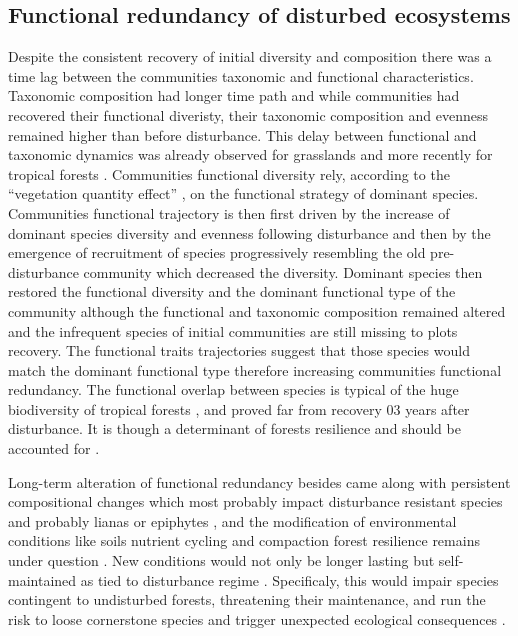 \documentclass[fleqn,10pt]{ArtEcoFoG} %
\theoremstyle{definition}
\theoremstyle{definition}
\theoremstyle{definition}
\theoremstyle{remark}
\begin{document}
\subsection{Functional redundancy of disturbed
ecosystems}\label{functional-redundancy-of-disturbed-ecosystems}

Despite the consistent recovery of initial diversity and composition
there was a time lag between the communities taxonomic and functional
characteristics. Taxonomic composition had longer time path and while
communities had recovered their functional diveristy, their taxonomic
composition and evenness remained higher than before disturbance. This
delay between functional and taxonomic dynamics was already observed for
grasslands \citep{Tilman1997, Mouillot2011} and more recently for
tropical forests \citep{Lohbeck2015, Guariguata2001}. Communities
functional diversity rely, according to the ``vegetation quantity
effect'' \citep{Grime1998}, on the functional strategy of dominant
species. Communities functional trajectory is then first driven by the
increase of dominant species diversity and evenness following
disturbance and then by the emergence of recruitment of species
progressively resembling the old pre-disturbance community which
decreased the diversity. Dominant species then restored the functional
diversity and the dominant functional type of the community although the
functional and taxonomic composition remained altered and the infrequent
species of initial communities are still missing to plots recovery. The
functional traits trajectories suggest that those species would match
the dominant functional type therefore increasing communities functional
redundancy. The functional overlap between species is typical of the
huge biodiversity of tropical forests \citep{Bellwood2006}, and proved
far from recovery 03 years after disturbance. It is though a determinant
of forests resilience and should be accounted for
\citep{Trenbath1999, Elmqvist2003, Diaz2005}.

Long-term alteration of functional redundancy besides came along with
persistent compositional changes which most probably impact disturbance
resistant species \citep{Haddad2008} and probably lianas or epiphytes
\citep{Martin2013}, and the modification of environmental conditions
like soils nutrient cycling and compaction \citep{Olander2005} forest
resilience remains under question \citep{Chazdon2003a}. New conditions
would not only be longer lasting but self-maintained as tied to
disturbance regime \citep{Burslem2000}. Specificaly, this would impair
species contingent to undisturbed forests, threatening their
maintenance, and run the risk to loose cornerstone species and trigger
unexpected ecological consequences
\citep{Jones1994, Diaz2005, Gardner2007}.





\end{document}
